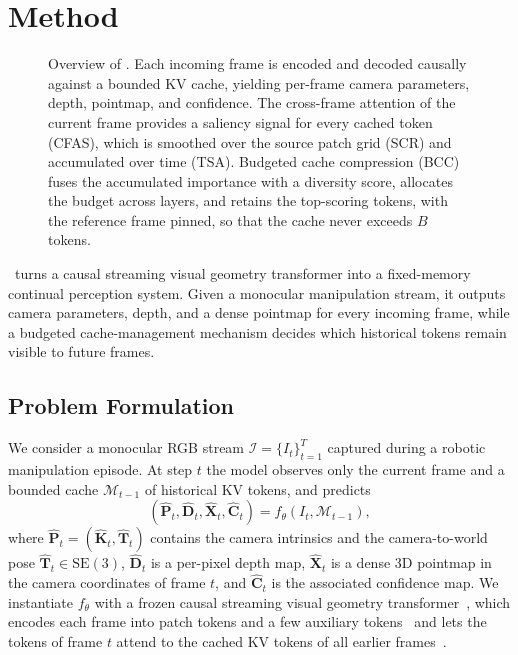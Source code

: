 \section{Method}
\label{sec:method}

\begin{figure}[t]
    \centering
    
    \caption{Overview of \method. Each incoming frame is encoded and decoded causally against a bounded KV cache, yielding per-frame camera parameters, depth, pointmap, and confidence. The cross-frame attention of the current frame provides a saliency signal for every cached token (CFAS), which is smoothed over the source patch grid (SCR) and accumulated over time (TSA). Budgeted cache compression (BCC) fuses the accumulated importance with a diversity score, allocates the budget across layers, and retains the top-scoring tokens, with the reference frame pinned, so that the cache never exceeds $B$ tokens.}
    \label{fig:pipeline}
\end{figure}

\method\ turns a causal streaming visual geometry transformer into a fixed-memory continual perception system. Given a monocular manipulation stream, it outputs camera parameters, depth, and a dense pointmap for every incoming frame, while a budgeted cache-management mechanism decides which historical tokens remain visible to future frames.

\subsection{Problem Formulation}
\label{sec:formulation}

We consider a monocular RGB stream $\mathcal{I}=\{I_t\}_{t=1}^{T}$ captured during a robotic manipulation episode. At step $t$ the model observes only the current frame and a bounded cache $\mathcal{M}_{t-1}$ of historical KV tokens, and predicts
\begin{equation}
(\hat{\mathbf{P}}_t, \hat{\mathbf{D}}_t, \hat{\mathbf{X}}_t, \hat{\mathbf{C}}_t)
= f_{\theta}(I_t, \mathcal{M}_{t-1}),
\label{eq:streaming}
\end{equation}
where $\hat{\mathbf{P}}_t=(\hat{\mathbf{K}}_t, \hat{\mathbf{T}}_t)$ contains the camera intrinsics and the camera-to-world pose $\hat{\mathbf{T}}_t\in\mathrm{SE}(3)$, $\hat{\mathbf{D}}_t$ is a per-pixel depth map, $\hat{\mathbf{X}}_t$ is a dense 3D pointmap in the camera coordinates of frame $t$, and $\hat{\mathbf{C}}_t$ is the associated confidence map. We instantiate $f_{\theta}$ with a frozen causal streaming visual geometry transformer~\cite{zhuo2025streamvggt}, which encodes each frame into patch tokens and a few auxiliary tokens~\cite{dosovitskiy2021vit,wang2025vggt} and lets the tokens of frame $t$ attend to the cached KV tokens of all earlier frames~\cite{vaswani2017attention}.

